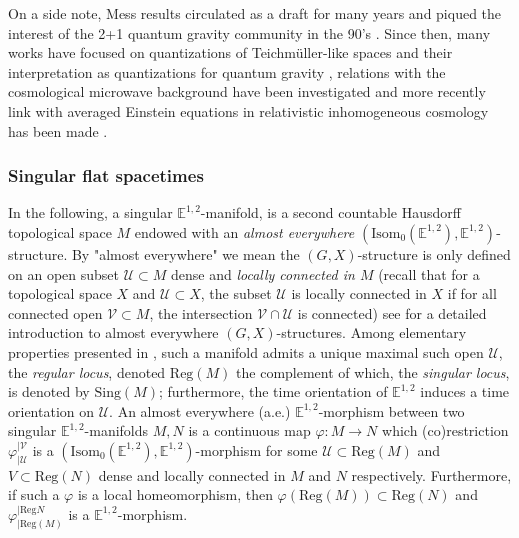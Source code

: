\documentclass[a4paper,12pt]{article}
\def\U{\mathcal U}
\def\isom{Isom}
\def\V{\mathcal V}
\def\sing{\mathrm{Sing}}
\newcommand{\mass}[1]{{\mathbb E}^{1,2}_{#1}}
\def\isom{\mathrm{Isom}}
\def\Reg{\mathrm{Reg}}
\def\reg{\Reg}
\begin{document}
On a side note, Mess results circulated as a draft for many years and piqued the interest of the 2+1 quantum gravity community in the 90's \cite{carlip_1998}.  Since then, many works have focused on quantizations of Teichmüller-like spaces 
\cite{MR3480556,MR3709650,MR3950651,MR2233852,moon2019rogeryang} and their interpretation as quantizations for quantum gravity \cite{carlip_1998,MR3523528}, relations with the cosmological microwave  background \cite{planck2019} have been investigated \cite{MR3245885} and more recently link with averaged Einstein equations in relativistic inhomogeneous cosmology \cite{Buchert_2007} has been made \cite{brunswic2020gaussbonnetchern}.



\subsubsection*{Singular flat spacetimes}
In the following, a singular $\mass{}$-manifold, is a second countable Hausdorff topological space $M$ endowed with an {\it almost everywhere} $(\isom_0(\mass{}),\mass{})$-structure. 
By "almost everywhere" we mean the $(G,X)$-structure is only defined on an open subset $\U\subset M$ dense and {\it locally connected in $M$} (recall that for a topological space $X$ and $\U\subset X$, the subset $\U$ is  locally connected in $X$ if for all connected open $\V\subset M$, the intersection $\V\cap \U$ is connected) see \cite{thesis,GXramcover} for a detailed introduction to almost everywhere $(G,X)$-structures. 
Among elementary properties presented in \cite{GXramcover}, such a manifold admits a unique maximal such open $\U$, the {\it regular locus}, denoted $\reg(M)$ the complement of which, the {\it singular locus}, is denoted by $\sing(M)$; furthermore, the time orientation of $\mass{}$ induces a time orientation on $\U$. An almost everywhere (a.e.) $\mass{}$-morphism between two singular $\mass{}$-manifolds $M, N$ is a continuous map $\varphi: M\rightarrow N$ which  (co)restriction $\varphi_{|\U}^{|\V}$ is a $(\isom_0(\mass{}),\mass{})$-morphism for some $\U\subset \reg(M)$ and $V\subset \reg(N)$  dense and locally connected in $M$ and $N$ respectively. Furthermore, if such a $\varphi$ is a local homeomorphism, then $\varphi(\reg(M)) \subset \reg(N)$ and $\varphi_{|\reg(M)}^{|\reg{N}}$ is a $\mass{}$-morphism.
\end{document}
